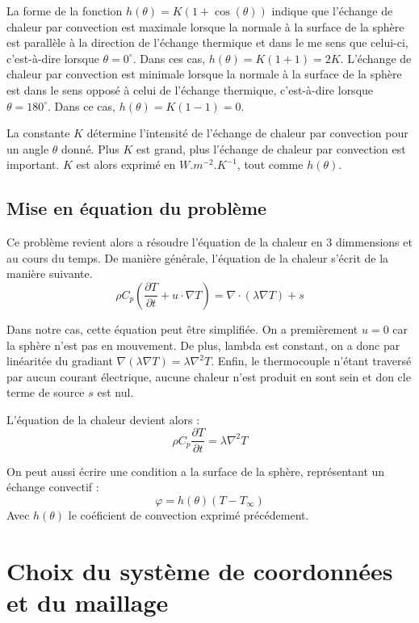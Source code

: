 \documentclass[fleqn]{article}
\renewcommand{\phi}{\varphi}
\begin{document}
La forme de la fonction $h(\theta) = K (1 + \cos(\theta))$ indique que l'échange de chaleur par convection est maximale lorsque la normale à la surface de la sphère est parallèle à la direction de l'échange thermique et dans le me sens que celui-ci, c'est-à-dire lorsque $\theta = 0^\circ$. Dans ces cas, $h(\theta) = K (1 + 1) = 2K$. L'échange de chaleur par convection est minimale lorsque la normale à la surface de la sphère est dans le sens opposé à celui de l'échange thermique, c'est-à-dire lorsque $\theta = 180^\circ$. Dans ce cas, $h(\theta) = K (1 - 1) = 0$.

La constante $K$ détermine l'intensité de l'échange de chaleur par convection pour un angle $\theta$ donné. Plus $K$ est grand, plus l'échange de chaleur par convection est important. $K$ est alors exprimé en $W.m^{-2}.K^{-1}$, tout comme $h(\theta)$.

\subsection{Mise en équation du problème}
Ce problème revient alors a résoudre l'équation de la chaleur en 3 dimmensions et au cours du temps.
De manière générale, l'équation de la chaleur s'écrit de la manière suivante.
\begin{equation}
    \rho C_p \left(  \frac{ \partial T}{\partial t} + u \cdot \nabla T \right) = \nabla \cdot ( \lambda  \nabla T) + s
\end{equation}

Dans notre cas, cette équation peut être simplifiée. On a premièrement $u = 0$ car la sphère n'est pas en mouvement. De plus, lambda est constant, on a donc par linéaritée du gradiant $\nabla ( \lambda \nabla T ) = \lambda \nabla^2 T$. Enfin, le thermocouple n'étant traversé par aucun courant électrique, aucune chaleur n'est produit en sont sein et don cle terme de source $s$ est nul.

L'équation de la chaleur devient alors :
\begin{equation}
    \rho C_p   \frac{ \partial T}{\partial t} = \lambda\nabla^2 T
    \label{equation_de_la_chaleur}
\end{equation}

On peut aussi écrire une condition a la surface de la sphère, représentant un échange convectif :
\[
\phi = h(\theta)(T-T_\infty)
\] 
Avec $h(\theta)$ le coéficient de convection exprimé précédement.


\newpage
\section{Choix du système de coordonnées et du maillage}
\end{document}
